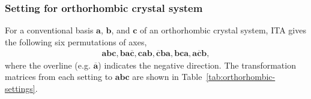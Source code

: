 \subsubsection{Setting for orthorhombic crystal system}

For a conventional basis $\bm{a}$, $\bm{b}$, and $\bm{c}$ of an orthorhombic crystal system, ITA gives the following six permutations of axes,
\begin{align*}
  \mathbf{abc}, \mathbf{ba\overline{c}}, \mathbf{cab}, \mathbf{\overline{c}ba}, \mathbf{bca}, \mathbf{a\overline{c}b},
\end{align*}
where the overline (e.g. $\mathbf{\overline{a}}$) indicates the negative direction.
The transformation matrices from each setting to $\mathbf{abc}$ are shown in Table~\ref{tab:orthorhombic-settings}.


